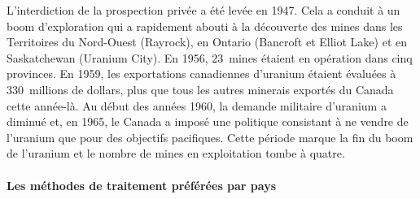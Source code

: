 \documentclass{article}
\begin{document}
L'interdiction de la prospection privée a été levée en 1947. Cela a conduit à un boom d'exploration qui a rapidement abouti à la découverte des mines dans les Territoires du Nord-Ouest (Rayrock), en Ontario (Bancroft et Elliot Lake) et en Saskatchewan (Uranium City). En 1956, 23~mines étaient en opération dans cinq provinces. En 1959, les exportations canadiennes d'uranium étaient évaluées à 330~millions de dollars, plus que tous les autres minerais exportés du Canada cette année-là. Au début des années 1960, la demande militaire d'uranium a diminué et, en 1965, le Canada a imposé une politique consistant à ne vendre de l'uranium que pour des objectifs pacifiques. Cette période marque la fin du boom de l'uranium et le nombre de mines en exploitation tombe à quatre.



\paragraph{Les méthodes de traitement préférées par pays}
\end{document}
